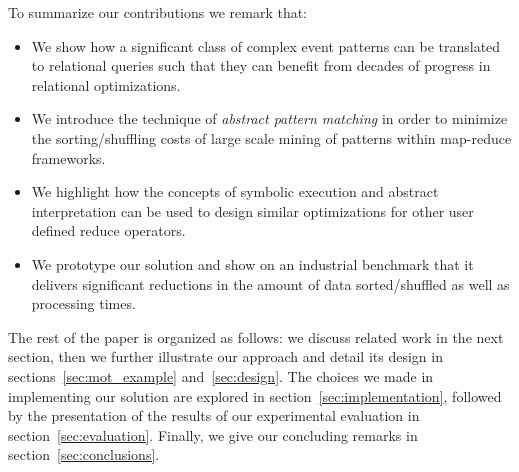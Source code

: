 To summarize our contributions we remark that:
\begin{itemize}
	\item We show how a significant class of complex event patterns can be 
	translated to relational queries such that they can benefit from decades of 
	progress in relational optimizations.
	\item We introduce the technique of {\em abstract pattern matching} in 
	order to minimize the sorting/shuffling costs of large scale mining of 
	patterns within map-reduce frameworks.
	\item We highlight how the concepts of symbolic execution and abstract 
	interpretation can be used to design similar optimizations for other user 
	defined reduce operators.
	\item We prototype our solution and show on an industrial benchmark that 
	it delivers significant reductions in the amount of data sorted/shuffled as 
	well as processing times.  
\end{itemize}


The rest of the paper is organized as follows: we discuss related work in the 
next section, then we further illustrate our approach and detail its design in 
sections~\ref{sec:mot_example} and~\ref{sec:design}. 
The choices we made in implementing our solution are explored in 
section~\ref{sec:implementation}, followed by the presentation of the results 
of our experimental evaluation in section~\ref{sec:evaluation}. 
Finally, we give our concluding remarks in section~\ref{sec:conclusions}.   


